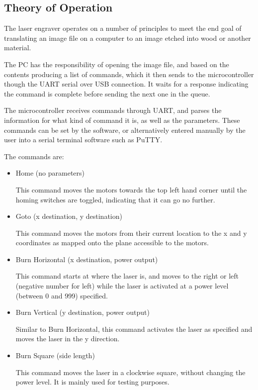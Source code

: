 \documentclass[11pt]{LaTeX-Classes/math-hw}
\begin{document}
\subsection{Theory of Operation}
The laser engraver operates on a number of principles to meet the end goal of
translating an image file on a computer to an image etched into wood or another material.

The PC has the responsibility of opening the image file, and based on the contents
producing a list of commands, which it then sends to the microcontroller though the
UART serial over USB connection. It waits for a response indicating the command is complete
before sending the next one in the queue.

The microcontroller receives commands through UART, and parses the information for
what kind of command it is, as well as the parameters.
These commands can be set by the software, or alternatively entered manually by the user
into a serial terminal software such as PuTTY.

The commands are:
\begin{itemize}
  \item Home (no parameters)

    This command moves the motors towards the top left hand corner until the homing switches
    are toggled, indicating that it can go no further.

  \item Goto (x destination, y destination)
    
    This command moves the motors from their current location to the x and y coordinates
    as mapped onto the plane accessible to the motors.

  \item Burn Horizontal (x destination, power output)

    This command starts at where the laser is, and moves to the right or left (negative number for left)
    while the laser is activated at a power level (between 0 and 999) specified.

  \item Burn Vertical (y destination, power output)
    
    Similar to Burn Horizontal, this command activates the laser as specified and moves the laser in the
    y direction.

  \item Burn Square (side length)

    This command moves the laser in a clockwise square, without changing the power level. It is
    mainly used for testing purposes.
\end{itemize}
\end{document}

